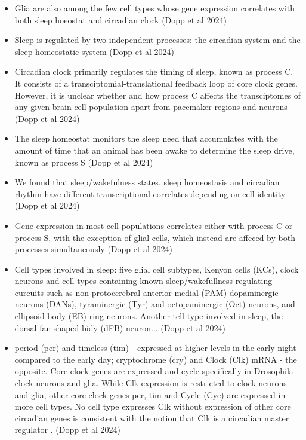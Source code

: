\documentclass[11pt]{article}
\begin{document}
\begin{itemize}
    \item Glia are also among the few cell types whose gene expression correlates with both sleep hoeostat and circadian clock \cite{doppSinglecellTranscriptomicsReveals2024}
    (Dopp et al 2024)

    \item Sleep is regulated by two independent processes: the circadian system and the sleep homeostatic system \cite{doppSinglecellTranscriptomicsReveals2024}
    (Dopp et al 2024)

    \item Circadian clock primarily regulates the timing of sleep, known as process C. It consists of a transciptomial-translational
    feedback loop of core clock genes. However, it is unclear whether and how process C affects the transciptomes of any given brain cell
    population apart from pacemaker regions and neurons \cite{doppSinglecellTranscriptomicsReveals2024}
    (Dopp et al 2024)

    \item The sleep homeostat monitors the sleep need that accumulates with the amount of time that an animal has been awake
    to determine the sleep drive, known as process S \cite{doppSinglecellTranscriptomicsReveals2024}
    (Dopp et al 2024)

    \item We found that sleep/wakefulness states, sleep homeostasis and circadian rhythm have different transcriptional correlates depending
    on cell identity \cite{doppSinglecellTranscriptomicsReveals2024}
    (Dopp et al 2024)

    \item Gene expression in most cell populations correlates either with process C or process S, with the exception of glial cells,
    which instead are affeced by both processes simultaneously \cite{doppSinglecellTranscriptomicsReveals2024}
    (Dopp et al 2024)

    \item Cell types involved in sleep: five glial cell subtypes, Kenyon cells (KCs), clock neurons and cell types containing
    known sleep/wakefullness regulating curcuits such as non-protocerebral anterior medial (PAM) dopaminergic neurons (DANs),
    tyraminergic (Tyr) and octopaminergic (Oct) neurons, and ellipsoid body (EB) ring neurons. Another tell type involved in sleep,
    the dorsal fan-shaped bidy (dFB) neuron... \cite{doppSinglecellTranscriptomicsReveals2024}
    (Dopp et al 2024)

    \item period (per) and timeless (tim) - expressed at higher levels in the early night compared to the early day;
    cryptochrome (cry) and Clock (Clk) mRNA - the opposite. Core clock genes are expressed and cycle specifically in Drosophila clock
    neurons and glia. While Clk expression is restricted to clock neurons and glia, other core clock genes per, tim and
    Cycle (Cyc) are expressed in more cell types. No cell type expresses Clk without expression of other core circadian genes is
    consistent with the notion that Clk is a circadian master regulator \cite{doppSinglecellTranscriptomicsReveals2024}.
    (Dopp et al 2024)


\end{itemize}
\end{document}
